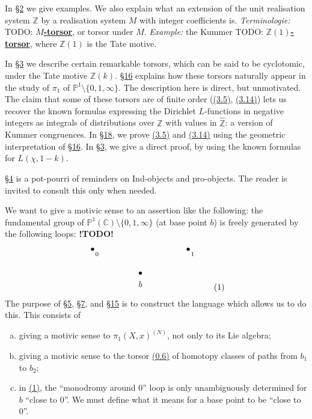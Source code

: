 \documentclass{article}
\theoremstyle{definition}
\newcommand{\bb}{\mathbb}
\newcommand{\PP}{\bb{P}}
\newcommand{\ZZ}{\bb{Z}}
\newcommand{\hZZ}{\widehat{\bb{Z}}}
\newcommand{\CC}{\bb{C}}
\newcommand{\unsure}[1]{TODO: \underline{\textbf{#1}}}
\newcommand{\todo}{\textbf{ !TODO! }}
\newcommand{\oldpage}[1]{\marginpar{\footnotesize$\Big\vert$ \textit{p.~#1}}}
\begin{document}
In \hyperref[2]{\S2} we give examples.
We also explain what an extension of the unit realisation system $\ZZ$ by a realisation system $M$ with integer coefficients is.
\emph{Terminologie:} \unsure{$M$-torsor}, or torsor under $M$.
\emph{Example:} the Kummer \unsure{$\ZZ(1)$-torsor}, where $\ZZ(1)$ is the Tate motive.

In \hyperref[3]{\S3} we describe certain remarkable torsors, which can be said to be cyclotomic, under the Tate motive $\ZZ(k)$.
\hyperref[16]{\S16} explains how these torsors naturally appear in the study of $\pi_1$ of $\PP^1\setminus\{0,1,\infty\}$.
The description here is direct, but unmotivated.
The claim that some of these torsors are of finite order (\hyperref[3.5]{(3.5)}, \hyperref[3.14]{(3.14)}) lets us recover the known formulas expressing the Dirichlet $L$-functions in negative integers as integrals of distributions over $\hZZ$ with values in $\hZZ$: a version of Kummer congruences.
In \hyperref[18]{\S18}, we prove \hyperref[3.5]{(3.5)} and \hyperref[3.14]{(3.14)} using the geometric interpretation of \hyperref[16]{\S16}.
In \hyperref[3]{\S3}, we give a direct proof, by using the known formulas for $L(\chi,1-k)$.

\hyperref[4]{\S4} is a pot-pourri of reminders on Ind-objects and pro-objects.
The reader is invited to consult this only when needed.

We want to give a motivic sense to an assertion like the following: the fundamental group of $\PP^1(\CC)\setminus\{0,1,\infty\}$ (at base point $b$) is freely generated by the following loops:
\todo
\[
\label{figure1}
  \begin{tikzpicture}
    \node[label=below:{$b$}] at (0,0) {$\bullet$};
    \node[label={[label distance=-3mm]below right:{\scriptsize$1$}}] at (2,1) {$\bullet$};
    \node[label={[label distance=-3mm]below right:{\scriptsize$0$}}] at (-2,1) {$\bullet$};
  \end{tikzpicture}
\tag{1}
\]
The purpose of \hyperref[5]{\S5}, \hyperref[7]{\S7}, and \hyperref[15]{\S15} is to construct the language which allows us to do this.
This consists of
\begin{enumerate}[(a)]
  \item giving a motivic sense to $\pi_1(X,x)^{(N)}$, not only to its Lie algebra;
  \item giving a motivic sense to the torsor \hyperref[0.6]{(0.6)} of homotopy classes of paths from $b_1$ to $b_2$;
  \item in \hyperref[figure1]{(1)}, the ``monodromy around $0$'' loop is only unambiguously determined
\oldpage{85}
    for $b$ ``close to $0$''.
    We must define what it means for a base point to be ``close to $0$''.
\end{enumerate}
\end{document}
